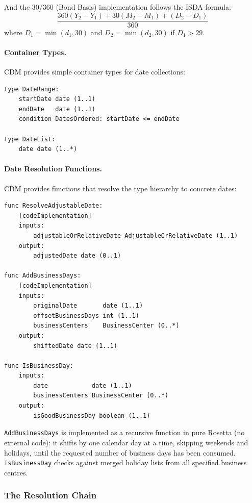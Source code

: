 \documentclass[11pt,a4paper]{article}
\begin{document}
\noindent And the 30/360 (Bond Basis) implementation follows the ISDA formula:
\[
\frac{360(Y_2 - Y_1) + 30(M_2 - M_1) + (D_2 - D_1)}{360}
\]
where $D_1 = \min(d_1, 30)$ and $D_2 = \min(d_2, 30)$ if $D_1 > 29$.

\paragraph{Container Types.} CDM provides simple container types for date collections:

\begin{lstlisting}
type DateRange:
    startDate date (1..1)
    endDate   date (1..1)
    condition DatesOrdered: startDate <= endDate

type DateList:
    date date (1..*)
\end{lstlisting}

\paragraph{Date Resolution Functions.} CDM provides functions that resolve the type hierarchy to concrete dates:

\begin{lstlisting}
func ResolveAdjustableDate:
    [codeImplementation]
    inputs:
        adjustableOrRelativeDate AdjustableOrRelativeDate (1..1)
    output:
        adjustedDate date (0..1)

func AddBusinessDays:
    [codeImplementation]
    inputs:
        originalDate       date (1..1)
        offsetBusinessDays int (1..1)
        businessCenters    BusinessCenter (0..*)
    output:
        shiftedDate date (1..1)

func IsBusinessDay:
    inputs:
        date            date (1..1)
        businessCenters BusinessCenter (0..*)
    output:
        isGoodBusinessDay boolean (1..1)
\end{lstlisting}

\noindent \texttt{AddBusinessDays} is implemented as a recursive function in pure Rosetta (no external code): it shifts by one calendar day at a time, skipping weekends and holidays, until the requested number of business days has been consumed. \texttt{IsBusinessDay} checks against merged holiday lists from all specified business centres.

\subsubsection{The Resolution Chain}
\label{sec:cdm-date-resolution}
\end{document}
